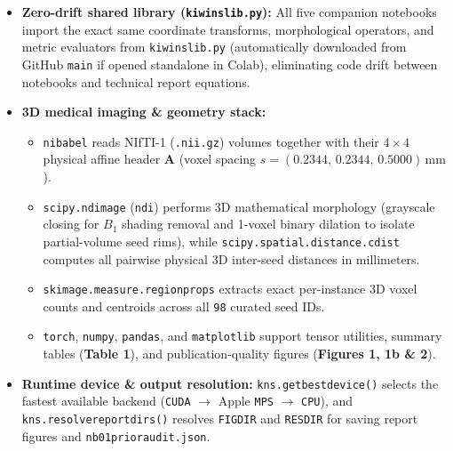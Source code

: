 \documentclass[10pt,a4paper]{article}
\renewcommand{\_}{\origunderscore\allowbreak}
\begin{document}
\begin{itemize}
\item \textbf{Zero-drift shared library (\texttt{kiwi\_ns\_lib.py}):} All five companion notebooks import the exact same coordinate transforms, morphological operators, and metric evaluators from \texttt{kiwi\_ns\_lib.py} (automatically downloaded from GitHub \texttt{main} if opened standalone in Colab), eliminating code drift between notebooks and technical report equations.
\item \textbf{3D medical imaging \& geometry stack:}
\begin{itemize}
\item \texttt{nibabel} reads NIfTI-1 (\texttt{.nii.gz}) volumes together with their $4 \times 4$ physical affine header $\mathbf{A}$ (voxel spacing $s = (0.2344,\, 0.2344,\, 0.5000)\,\text{mm}$).
\item \texttt{scipy.ndimage} (\texttt{ndi}) performs 3D mathematical morphology (grayscale closing for $B_1$ shading removal and 1-voxel binary dilation to isolate partial-volume seed rims), while \texttt{scipy.spatial.distance.cdist} computes all pairwise physical 3D inter-seed distances in millimeters.
\item \texttt{skimage.measure.regionprops} extracts exact per-instance 3D voxel counts and centroids across all \texttt{98} curated seed IDs.
\item \texttt{torch}, \texttt{numpy}, \texttt{pandas}, and \texttt{matplotlib} support tensor utilities, summary tables (\textbf{Table 1}), and publication-quality figures (\textbf{Figures 1, 1b \& 2}).
\end{itemize}
\item \textbf{Runtime device \& output resolution:} \texttt{kns.get\_best\_device()} selects the fastest available backend (\texttt{CUDA} $\to$ Apple \texttt{MPS} $\to$ \texttt{CPU}), and \texttt{kns.resolve\_report\_dirs()} resolves \texttt{FIG\_DIR} and \texttt{RES\_DIR} for saving report figures and \texttt{nb01\_prior\_audit.json}.
\end{itemize}
\end{document}
